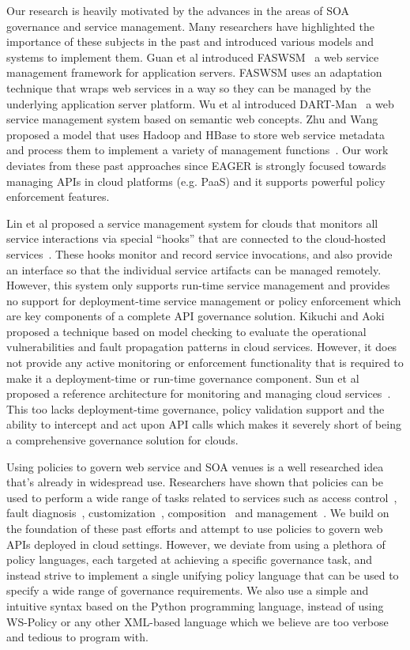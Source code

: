 Our research is heavily motivated by the advances in the areas of SOA governance and service management. Many researchers have highlighted the
importance of these subjects in the past and introduced various models and systems to implement them. Guan et al introduced FASWSM~\cite{1607141} a web service
management framework for application servers. FASWSM uses an adaptation technique that wraps web services in a way so they can be managed by the
underlying application server platform. Wu et al introduced DART-Man~\cite{1504267} a web service management system based on semantic web concepts.
Zhu and Wang proposed a model that uses Hadoop and HBase to store web service metadata and process them to implement a variety of management
functions~\cite{5959326}. Our work deviates from these past approaches since EAGER is strongly focused towards managing APIs in cloud platforms (e.g. PaaS)
and it supports powerful policy enforcement features.

Lin et al proposed a service management system for clouds that monitors all service interactions via special ``hooks'' that are connected to the
cloud-hosted services~\cite{5616981}. These hooks monitor and record service invocations, and also provide an interface so that
the individual service artifacts can be managed remotely. However, this system only supports run-time service management and provides no support for 
deployment-time service management or policy enforcement which are key components of a complete API governance solution. Kikuchi and Aoki~\cite{6525502} proposed
a technique based on model checking to evaluate the operational vulnerabilities and fault propagation patterns in cloud services. However, it does not provide
any active monitoring or enforcement functionality that is required to make it a deployment-time or run-time governance component. Sun et al proposed a reference
architecture for monitoring and managing cloud services~\cite{5579654}. This too lacks deployment-time governance, policy validation support and the ability to 
intercept and act upon API calls which makes it severely short of being a comprehensive governance solution for clouds.

Using policies to govern web service and SOA venues is a well researched idea that's already in widespread use. Researchers have shown that
policies can be used to perform a wide range of tasks related to services such as access control~\cite{4279630,5713420}, fault
diagnosis~\cite{6154236}, customization~\cite{4027138}, composition~\cite{1592403,Erradi:2006:PMS:1515984.1515990} and 
management~\cite{Suleiman:2009:IUM:1564601.1564730,6481237,4028029}. We build on the foundation of these past efforts and attempt
to use policies to govern web APIs deployed in cloud settings. However, we deviate from using a plethora of policy languages, each targeted at achieving 
a specific governance task, and instead strive to implement a single unifying policy language that can be used to specify a wide range of governance
requirements. We also use a simple and intuitive syntax based on the Python programming language, instead of using WS-Policy or any other XML-based
language which we believe are too verbose and tedious to program with.

